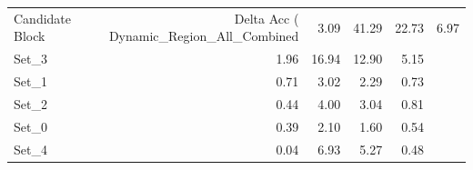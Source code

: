 \begin{tabular}{lrrrr}
\toprule
Candidate Block & Delta Acc (%
\midrule
Dynamic_Region_All_Combined & 3.09 & 41.29 & 22.73 & 6.97 \\
Set_3 & 1.96 & 16.94 & 12.90 & 5.15 \\
Set_1 & 0.71 & 3.02 & 2.29 & 0.73 \\
Set_2 & 0.44 & 4.00 & 3.04 & 0.81 \\
Set_0 & 0.39 & 2.10 & 1.60 & 0.54 \\
Set_4 & 0.04 & 6.93 & 5.27 & 0.48 \\
\bottomrule
\end{tabular}
